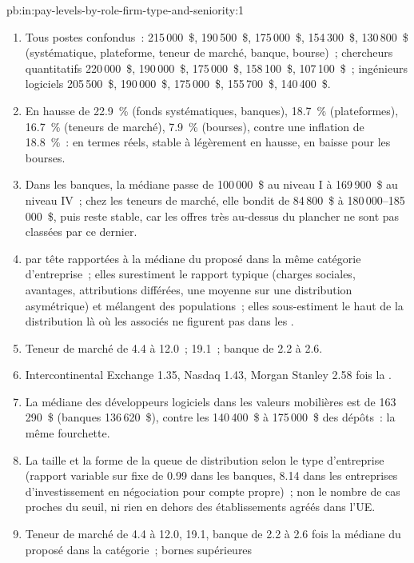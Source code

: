 \begin{solution}{pb:in:pay-levels-by-role-firm-type-and-seniority:1}
\begin{enumerate}
\item Tous postes confondus~: 215\,000~\$, 190\,500~\$, 175\,000~\$, 154\,300~\$, 130\,800~\$ (systématique, plateforme, teneur de marché, banque,
bourse)~; chercheurs quantitatifs 220\,000~\$, 190\,000~\$, 175\,000~\$, 158\,100~\$, 107\,100~\$~; ingénieurs logiciels
205\,500~\$, 190\,000~\$, 175\,000~\$, 155\,700~\$, 140\,400~\$.
\item En hausse de 22.9~\% (fonds systématiques, banques), 18.7~\% (plateformes), 16.7~\% (teneurs de marché), 7.9~\% (bourses), contre
une inflation de 18.8~\%~: en termes réels, stable à légèrement en hausse, en baisse pour les bourses.
\item Dans les banques, la médiane passe de 100\,000~\$ au niveau I à 169\,900~\$ au niveau IV~; chez les teneurs de marché, elle bondit de
84\,800~\$ à 180\,000--185\,000~\$, puis reste stable, car les offres très au-dessus du plancher ne sont pas classées par ce dernier.
\item {} par tête rapportées à la médiane du  proposé dans la même catégorie d'entreprise~; elles surestiment le rapport typique (charges sociales,
avantages, attributions différées, une moyenne sur une distribution asymétrique) et mélangent des populations~; elles sous-estiment le haut de la distribution là où
les associés ne figurent pas dans les .
\item Teneur de marché de 4.4 à 12.0~;  19.1~; banque de 2.2 à 2.6.
\item Intercontinental Exchange 1.35, Nasdaq 1.43, Morgan Stanley 2.58 fois la .
\item La médiane des développeurs logiciels dans les valeurs mobilières est de 163\,290~\$ (banques 136\,620~\$), contre les 140\,400~\$ à 175\,000~\$ des dépôts~:
la même fourchette.
\item La taille et la forme de la queue de distribution selon le type d'entreprise (rapport variable sur fixe de 0.99 dans les banques, 8.14 dans les entreprises d'investissement en
négociation pour compte propre)~; non le nombre de cas proches du seuil, ni rien en dehors des établissements agréés dans l'UE.
\item Teneur de marché de 4.4 à 12.0,  19.1, banque de 2.2 à 2.6 fois la médiane du  proposé dans la catégorie~; bornes supérieures

\end{enumerate}
\end{solution}
